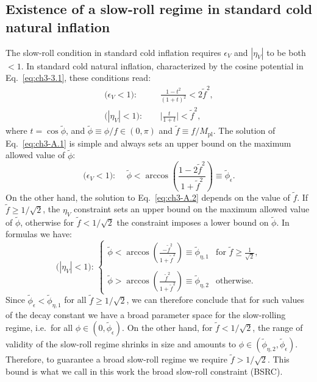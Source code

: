\begin{subappendices}

\section{Existence of a slow-roll regime in standard cold natural inflation \label{app:ch3-A}}

The slow-roll condition in standard cold inflation requires $\epsilon_V$ and $|\eta_V|$ to be both $<1$. In standard cold natural inflation, characterized by the cosine potential in Eq.~\ref{eq:ch3-3.1}, these conditions read:
\begin{align}
\text{($\epsilon_{V}<1$): }& \quad  \frac{1-t^2}{(1+t)^{2}}<2\tilde{f}^2, \label{eq:ch3-A.1} \\
\text{($|\eta_{V}|<1$): }& \quad \Big|\frac{t}{1+t}\Big|<\tilde{f}^2, \label{eq:ch3-A.2}
\end{align}
where $t=\cos\tilde{\phi}$, and $\tilde{\phi}\equiv \phi/f\in(0,\pi)$ and $\tilde{f}\equiv f/M_{\mathrm{pl}}$. The solution of Eq.~\ref{eq:ch3-A.1} is simple and always sets an upper bound on the maximum allowed value of $\tilde{\phi}$:
\begin{equation}
 \text{($\epsilon_{V}<1$): } \quad   \tilde{\phi}<\arccos{\left(\frac{1-2\tilde{f}^2}{1+\tilde{f}^2}\right)}\equiv \tilde{\phi}_\epsilon.
\end{equation}
On the other hand, the solution to Eq.~\ref{eq:ch3-A.2} depends on the value of $\tilde{f}$. If $\tilde{f}\geq 1/\sqrt{2}$, the $\eta_V$ constraint sets an upper bound on the maximum allowed value of $\tilde{\phi}$, otherwise for $\tilde{f}< 1/\sqrt{2}$ the constraint imposes a lower bound on $\tilde{\phi}$. In formulas we have:
\begin{equation}
    \text{($|\eta_{V}|<1$): } \begin{cases}
  \tilde{\phi}<\arccos{\left(\frac{-\tilde{f}^2}{1+\tilde{f}^2}\right)}\equiv \tilde{\phi}_{\eta,1} & \text{for } \tilde{f}\geq\frac{1}{\sqrt{2}}, \\
  \\
  \tilde{\phi}>\arccos{\left(\frac{\tilde{f}^2}{1+\tilde{f}^2}\right)}\equiv \tilde{\phi}_{\eta,2} & \text{otherwise.}
\end{cases}
\end{equation}
Since $\tilde{\phi}_\epsilon<\tilde{\phi}_{\eta,1}$ for all $\tilde{f}\geq 1/\sqrt{2}$, we can therefore conclude that for such values of the decay constant we have a broad parameter space for the slow-rolling regime, i.e.\ for all $\phi\in(0,\tilde{\phi}_\epsilon)$. On the other hand, for $\tilde{f}<1/\sqrt{2}$, the range of validity of the slow-roll regime shrinks in size and amounts to $\phi\in(\tilde{\phi}_{\eta,2},\tilde{\phi}_\epsilon)$. Therefore, to guarantee a broad slow-roll regime we require $\tilde{f}>1/\sqrt{2}$. This bound is what we call in this work the broad slow-roll constraint (BSRC).


\end{subappendices}
